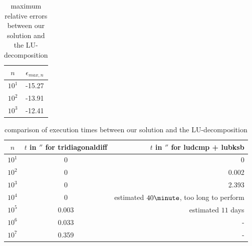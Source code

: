 \documentclass[11pt,a4wide]{article}
\begin{document}
 \begin{table}%
\centering
\caption{maximum relative errors between our solution and the LU-decomposition} 
\begin{tabular}{cc}\hline
$n$ & $\epsilon_{max,n}$\\\hline
$10^1$ & -15.27 \\ 
$10^2$ & -13.91\\ 
$10^3$ & -12.41 \\ \hline
 \end{tabular}
 \label{LUvsown}
 \end{table}
 \begin{table}%
\centering
\caption{comparison of execution times between our solution and the LU-decomposition}
  \begin{tabular}{ccr}\hline
$n$ & $t$ in $\second$ for tridiagonaldiff & $t$ in $\second$ for ludcmp + lubksb \\\hline
$10^1$ & 0 & 0 \\ 
$10^2$ & 0 & 0.002 \\
$10^3$ & 0 & 2.393 \\
$10^4$ & 0 & estimated $40\minute$, too long to perform\\
$10^5$ & 0.003 & estimated $11$ days\\
$10^6$ & 0.033 & - \\
$10^7$ & 0.359 & -  \\ \hline
\end{tabular}
 \label{LUvsowncomp}
 \end{table}
\end{document}
